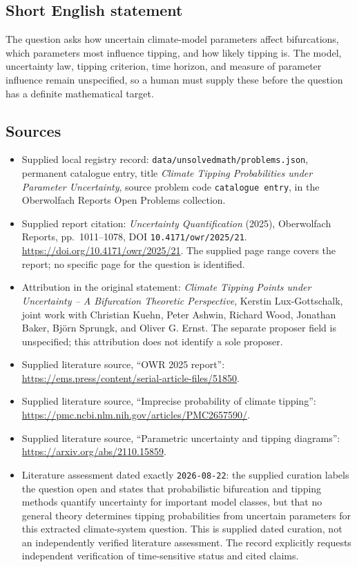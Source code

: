 \documentclass[11pt]{article}
\begin{document}
\subsection{Short English statement}
The question asks how uncertain climate-model parameters affect bifurcations, which parameters most influence tipping, and how likely tipping is. The model, uncertainty law, tipping criterion, time horizon, and measure of parameter influence remain unspecified, so a human must supply these before the question has a definite mathematical target.
\subsection{Sources}
\begin{itemize}
\item Supplied local registry record: \texttt{data/unsolvedmath/problems.json}, permanent catalogue entry, title \emph{Climate Tipping Probabilities under Parameter Uncertainty}, source problem code \texttt{catalogue entry}, in the Oberwolfach Reports Open Problems collection.
\item Supplied report citation: \emph{Uncertainty Quantification} (2025), Oberwolfach Reports, pp.~1011--1078, DOI \texttt{10.4171/owr/2025/21}. \url{https://doi.org/10.4171/owr/2025/21}. The supplied page range covers the report; no specific page for the question is identified.
\item Attribution in the original statement: \emph{Climate Tipping Points under Uncertainty -- A Bifurcation Theoretic Perspective}, Kerstin Lux-Gottschalk, joint work with Christian Kuehn, Peter Ashwin, Richard Wood, Jonathan Baker, Björn Sprungk, and Oliver G. Ernst. The separate proposer field is unspecified; this attribution does not identify a sole proposer.
\item Supplied literature source, ``OWR 2025 report'': \url{https://ems.press/content/serial-article-files/51850}.
\item Supplied literature source, ``Imprecise probability of climate tipping'': \url{https://pmc.ncbi.nlm.nih.gov/articles/PMC2657590/}.
\item Supplied literature source, ``Parametric uncertainty and tipping diagrams'': \url{https://arxiv.org/abs/2110.15859}.
\item Literature assessment dated exactly \texttt{2026-08-22}: the supplied curation labels the question open and states that probabilistic bifurcation and tipping methods quantify uncertainty for important model classes, but that no general theory determines tipping probabilities from uncertain parameters for this extracted climate-system question. This is supplied dated curation, not an independently verified literature assessment. The record explicitly requests independent verification of time-sensitive status and cited claims.
\end{itemize}
\end{document}
